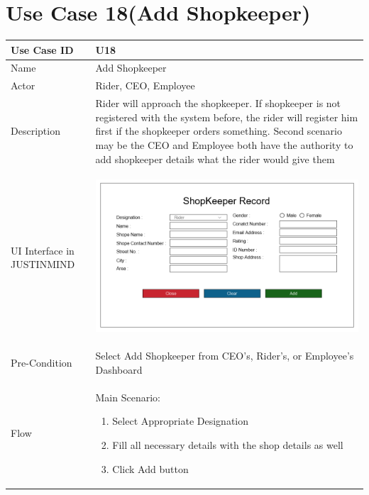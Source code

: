 \documentclass[12pt,a4paper]{report}
\begin{document}
\section{Use Case 18(Add Shopkeeper)}

\begin{tabular}{ | m{3cm} | m{12cm}| } \hline

Use Case ID & U18  \\\hline

Name  	    &  Add Shopkeeper \\ \hline

Actor     	& Rider, CEO, Employee \\ \hline

Description & Rider will approach the shopkeeper. If shopkeeper is not registered with the system before, the rider will register him first if the shopkeeper orders something. Second scenario may be the CEO and Employee both have the authority to add shopkeeper details what the rider would give them   \\ \hline

UI Interface in JUSTINMIND & \begin{center} \includegraphics[scale=0.3]{./UIs for Latex Reports/UI-025 Add ShopKeeper@1x.png}\end{center}  \\ \hline

Pre-Condition & Select Add Shopkeeper from CEO’s, Rider’s, or Employee’s Dashboard  \\ \hline


Flow & Main Scenario:

\begin{enumerate}
\item   Select Appropriate Designation
\item  Fill all necessary details with the shop details as well
\item  Click Add button



\end{enumerate}
\end{tabular}
\end{document}
